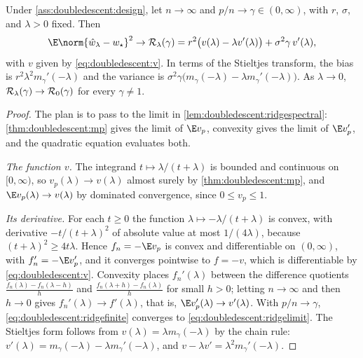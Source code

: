 \begin{refsection}
\begin{theorem}\label{thm:doubledescent:ridge}
Under \cref{ass:doubledescent:design}, let $n\to\infty$ and $p/n\to\gamma\in(0,\infty)$, with $r$, $\sigma$, and $\lambda>0$ fixed. Then
\begin{equation}\label{eq:doubledescent:ridgelimit}
  \E\norm{\hat w_\lambda-w_\star}^2\to\cR_\lambda(\gamma)=r^2\bigl(v(\lambda)-\lambda v'(\lambda)\bigr)+\sigma^2\gamma\,v'(\lambda),
\end{equation}
with $v$ given by \eqref{eq:doubledescent:v}. In terms of the Stieltjes transform, the bias is $r^2\lambda^2m_\gamma'(-\lambda)$ and the variance is $\sigma^2\gamma\bigl(m_\gamma(-\lambda)-\lambda m_\gamma'(-\lambda)\bigr)$. As $\lambda\to0$, $\mathcal{R}_\lambda(\gamma)\to\mathcal{R}_0(\gamma)$ for every $\gamma\ne1$.
\end{theorem}

\begin{proof}
The plan is to pass to the limit in \cref{lem:doubledescent:ridgespectral}: \cref{thm:doubledescent:mp} gives the limit of $\E v_p$, convexity gives the limit of $\E v_p'$, and the quadratic equation evaluates both.

\emph{The function $v$.} The integrand $t\mapsto\lambda/(t+\lambda)$ is bounded and continuous on $[0,\infty)$, so $v_p(\lambda)\to v(\lambda)$ almost surely by \cref{thm:doubledescent:mp}, and $\E v_p(\lambda)\to v(\lambda)$ by dominated convergence, since $0\le v_p\le1$.

\emph{Its derivative.} For each $t\ge0$ the function $\lambda\mapsto-\lambda/(t+\lambda)$ is convex, with derivative $-t/(t+\lambda)^2$ of absolute value at most $1/(4\lambda)$, because $(t+\lambda)^2\ge4t\lambda$. Hence $f_n=-\E v_p$ is convex and differentiable on $(0,\infty)$, with $f_n'=-\E v_p'$, and it converges pointwise to $f=-v$, which is differentiable by \eqref{eq:doubledescent:v}. Convexity places $f_n'(\lambda)$ between the difference quotients $\frac{f_n(\lambda)-f_n(\lambda-h)}h$ and $\frac{f_n(\lambda+h)-f_n(\lambda)}h$ for small $h>0$; letting $n\to\infty$ and then $h\to0$ gives $f_n'(\lambda)\to f'(\lambda)$, that is, $\E v_p'(\lambda)\to v'(\lambda)$. With $p/n\to\gamma$, \eqref{eq:doubledescent:ridgefinite} converges to \eqref{eq:doubledescent:ridgelimit}. The Stieltjes form follows from $v(\lambda)=\lambda m_\gamma(-\lambda)$ by the chain rule: $v'(\lambda)=m_\gamma(-\lambda)-\lambda m_\gamma'(-\lambda)$, and $v-\lambda v'=\lambda^2m_\gamma'(-\lambda)$.


\end{proof}
\end{refsection}

